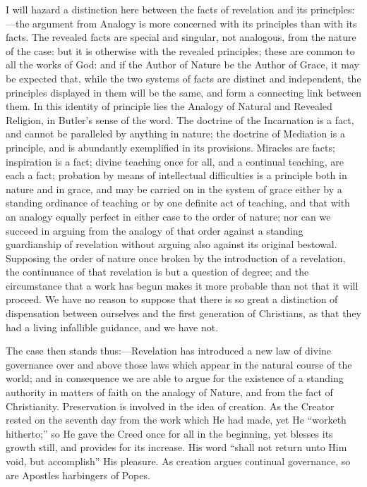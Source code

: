 I will hazard a distinction here between the facts of
revelation and its principles:—the argument from
Analogy is more concerned with its principles than with
its facts. The revealed facts are special and singular,
not analogous, from the nature of the case: but it is
otherwise with the revealed principles; these are common
to all the works of God: and if the Author of Nature be
the Author of Grace, it may be expected that, while the
two systems of facts are distinct and independent, the
principles displayed in them will be the same, and form a
connecting link between them. In this identity of
principle lies the Analogy of Natural and Revealed
Religion, in Butler's sense of the word. The doctrine of
the Incarnation is a fact, and cannot be paralleled by
anything in nature; the doctrine of Mediation is a
principle, and is abundantly exemplified in its
provisions. Miracles are facts; inspiration is a fact;
divine teaching once for all, and a continual teaching,
are each a fact; probation by means of intellectual
difficulties is a principle both in nature and in grace,
and may be carried on in the system of grace either by a
standing ordinance of teaching or by one definite act of
teaching, and that with an analogy equally perfect in
either case to the order of nature; nor can we succeed in
arguing from the analogy of that order against a standing
guardianship of revelation without arguing also against
its original bestowal. Supposing the order of nature once
broken by the introduction of a revelation, the
continuance of that revelation is but a question of
degree; and the circumstance that a work has begun makes
it more probable than not that it will proceed. We have
no reason to suppose that there is so great a distinction
of dispensation between ourselves and the first
generation of Christians, as that they had a living
infallible guidance, and we have not.

The case then stands thus:—Revelation has
introduced a new law of divine governance over and above
those laws which appear in the natural course of the
world; and in consequence we are able to argue for the
existence of a standing authority in matters of faith on
the analogy of Nature, and from the fact of Christianity.
Preservation is involved in the idea of creation. As the
Creator rested on the seventh day from the work which He
had made, yet He ``worketh hitherto;'' so He gave
the Creed once for all in the beginning, yet blesses its
growth still, and provides for its increase. His word
``shall not return unto Him void, but
accomplish'' His pleasure. As creation argues
continual governance, so are Apostles harbingers of
Popes.

